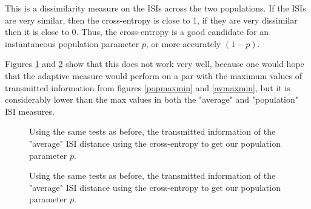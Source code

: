 \documentclass[12pt]{amsart}
\begin{document}
This is a dissimilarity measure on the ISIs across the two populations.  If the ISIs are very similar, then the cross-entropy is close to 1, if they are very dissimilar then it is close to 0.  Thus, the cross-entropy is a good candidate for an instantaneous population parameter $p$, or more accurately $(1-p)$.

Figures \ref{adpop} and \ref{adav} show that this does not work very well, because one would hope that the adaptive measure would perform on a par with the maximum values of transmitted information from figures \ref{popmaxmin} and \ref{avmaxmin}, but it is considerably lower than the max values in both the "average" and "population" ISI measures.


\begin{figure}[Bht]
\begin{center}

\end{center}
\caption{\label{adpop}Using the same tests as before, the transmitted information of the "average" ISI distance using the cross-entropy to get our population parameter $p$.}
\end{figure}

\begin{figure}[Bht]
\begin{center}

\end{center}
\caption{\label{adav}Using the same tests as before, the transmitted information of the "average" ISI distance using the cross-entropy to get our population parameter $p$.}
\end{figure}



\end{document}
